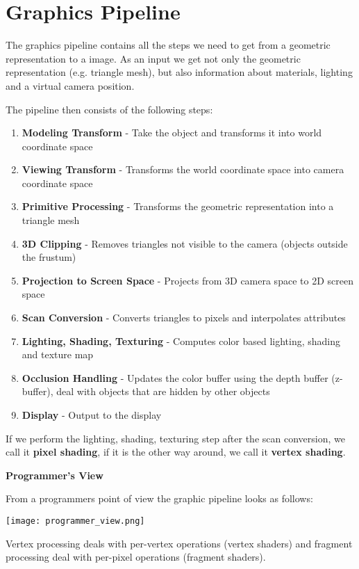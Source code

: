 \section{Graphics Pipeline}

The graphics pipeline contains all the steps we need to get from a geometric representation to a image. As an input we get not only the geometric representation (e.g. triangle mesh), but also information about materials, lighting and a virtual camera position. \medskip

The pipeline then consists of the following steps:
\begin{enumerate}
	\item \textbf{Modeling Transform} - Take the object and transforms it into world coordinate space
	\item \textbf{Viewing Transform} - Transforms the world coordinate space into camera coordinate space
	\item \textbf{Primitive Processing} - Transforms the geometric representation into a triangle mesh
	\item \textbf{3D Clipping} - Removes triangles not visible to the camera (objects outside the frustum)
	\item \textbf{Projection to Screen Space} - Projects from 3D camera space to 2D screen space
	\item \textbf{Scan Conversion} - Converts triangles to pixels and interpolates attributes
	\item \textbf{Lighting, Shading, Texturing} - Computes color based lighting, shading and texture map
	\item \textbf{Occlusion Handling} - Updates the color buffer using the depth buffer (z-buffer), deal with objects that are hidden by other objects
	\item \textbf{Display} - Output to the display
\end{enumerate}

If we perform the lighting, shading, texturing step after the scan conversion, we call it \textbf{pixel shading}, if it is the other way around, we call it \textbf{vertex shading}. \medskip

\textbf{Programmer's View} \smallskip

From a programmers point of view the graphic pipeline looks as follows:
\begin{center}
	\texttt{[image: programmer\_view.png]}
\end{center}

Vertex processing deals with per-vertex operations (vertex shaders) and fragment processing deal with per-pixel operations (fragment shaders).
